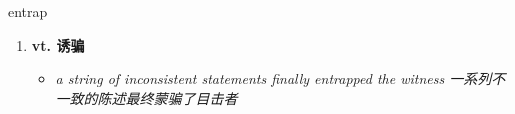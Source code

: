 
\begin{frame}
{\huge entrap}
\begin{center}
\begin{enumerate}\Large
  \item \textbf{vt. 诱骗}
  \begin{itemize}
    \item \em{\Large{a string of inconsistent statements finally entrapped the witness 一系列不一致的陈述最终蒙骗了目击者}}
  \end{itemize}
\end{enumerate}
\end{center}
\end{frame}
